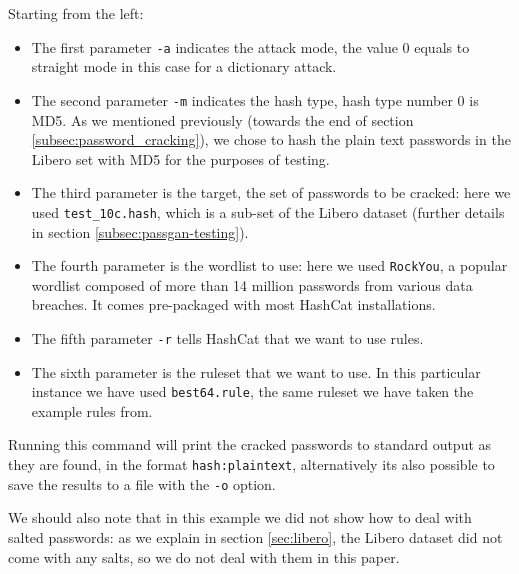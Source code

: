 Starting from the left:
\begin{itemize}
\item The first parameter \texttt{-a} indicates the attack mode, the value 0 equals to straight mode in this case for a dictionary attack.

\item The second parameter \texttt{-m} indicates the hash type, hash type number 0 is MD5. As we mentioned previously (towards the end of section \ref{subsec:password_cracking}), we chose to hash the plain text passwords in the Libero set with MD5 for the purposes of testing.

\item The third parameter is the target, the set of passwords to be cracked: here we used \texttt{test\_10c.hash}, which is a sub-set of the Libero dataset (further details in section \ref{subsec:passgan-testing}).

\item The fourth parameter is the wordlist to use: here we used \texttt{RockYou}, a popular wordlist composed of more than 14 million passwords from various data breaches. It comes pre-packaged with most HashCat installations.

\item The fifth parameter \texttt{-r} tells HashCat that we want to use rules.

\item The sixth parameter is the ruleset that we want to use. In this particular instance we have used \texttt{best64.rule}, the same ruleset we have taken the example rules from.    
\end{itemize}

Running this command will print the cracked passwords to standard output as they are found, in the format \texttt{hash:plaintext}, alternatively its also possible to save the results to a file with the \texttt{-o} option.

We should also note that in this example we did not show how to deal with salted passwords: as we explain in section \ref{sec:libero}, the Libero dataset did not come with any salts, so we do not deal with them in this paper.
